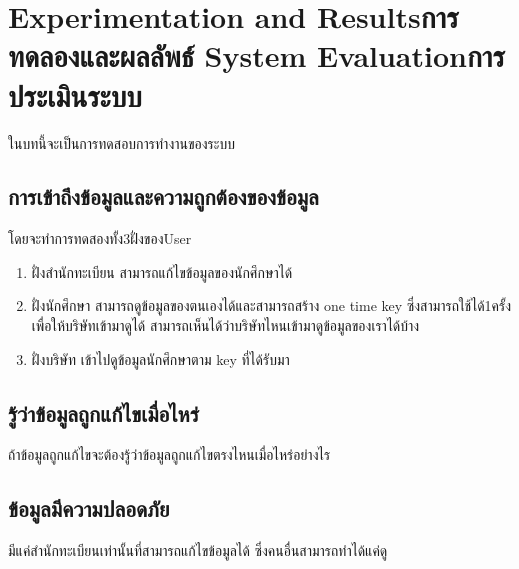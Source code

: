 \chapter{\ifproject%
\ifenglish Experimentation and Results\else การทดลองและผลลัพธ์\fi
\else%
\ifenglish System Evaluation\else การประเมินระบบ\fi
\fi}

\enskip \enskip \enskip \enskip \enskip ในบทนี้จะเป็นการทดสอบการทำงานของระบบ
\section{การเข้าถึงข้อมูลและความถูกต้องของข้อมูล}
โดยจะทำการทดสองทั้ง3ฝั่งของUser
\begin{enumerate}
\item ฝั่งสำนักทะเบียน สามารถแก้ไขข้อมูลของนักศึกษาได้
\item ฝั่งนักศึกษา สามารถดูข้อมูลของตนเองได้และสามารถสร้าง one time key ซึ่งสามารถใช้ได้1ครั้ง เพื่อให้บริษัทเข้ามาดูได้ สามารถเห็นได้ว่าบริษัทไหนเข้ามาดูข้อมูลของเราได้บ้าง
\item ฝั่งบริษัท เข้าไปดูข้อมูลนักศึกษาตาม key ที่ได้รับมา
\end{enumerate}
\section{รู้ว่าข้อมูลถูกแก้ไขเมื่อไหร่ }
ถ้าข้อมูลถูกแก้ไขจะต้องรู้ว่าข้อมูลถูกแก้ไขตรงไหนเมื่อไหร่อย่างไร

\section{ข้อมูลมีความปลอดภัย}
มีแค่สำนักทะเบียนเท่านั้นที่สามารถแก้ไขข้อมูลได้ ซึ่งคนอื่นสามารถทำได้แค่ดู 


